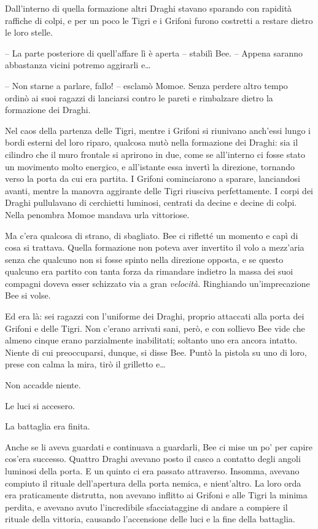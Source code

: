 {Dall'interno di quella formazione altri Draghi stavano sparando con
	rapidità raffiche di colpi, e per un poco le Tigri e i Grifoni furono
	costretti a restare dietro le loro stelle.}

{-- La parte posteriore di quell'affare lì è aperta -- stabilì Bee. --
	Appena saranno abbastanza vicini potremo aggirarli e\ldots{}}

{-- Non starne a parlare, fallo! -- esclamò Momoe. Senza perdere altro
	tempo ordinò ai suoi ragazzi di lanciarsi contro le pareti e rimbalzare
	dietro la formazione dei Draghi.}

{Nel caos della partenza delle Tigri, mentre i Grifoni si riunivano
	anch'essi lungo i bordi esterni del loro riparo, qualcosa mutò nella
	formazione dei Draghi: sia il cilindro che il muro frontale si aprirono
	in due, come se all'interno ci fosse stato un movimento molto energico,
	e all'istante essa invertì la direzione, tornando verso la porta da cui
	era partita. I Grifoni cominciarono a sparare, lanciandosi avanti,
	mentre la manovra aggirante delle Tigri riusciva perfettamente. I corpi
	dei Draghi pullulavano di cerchietti luminosi, centrati da decine e
	decine di colpi. Nella penombra Momoe mandava urla vittoriose.}

{Ma c'era qualcosa di strano, di sbagliato. Bee ci rifletté un momento e
	capì di cosa si trattava. Quella formazione non poteva aver invertito il
	volo a mezz'aria senza che qualcuno non si fosse spinto nella direzione
	opposta, e se questo qualcuno era partito con tanta forza da rimandare
	indietro la massa dei suoi compagni doveva esser schizzato via a gran
	\emph{velocità.} Ringhiando un'imprecazione Bee si volse.}

{Ed era là: sei ragazzi con l'uniforme dei Draghi, proprio attaccati
	alla porta dei Grifoni e delle Tigri. Non c'erano arrivati sani, però, e
	con sollievo Bee vide che almeno cinque erano parzialmente inabilitati;
	soltanto uno era ancora intatto. Niente di cui preoccuparsi, dunque, si
	disse Bee. Puntò la pistola su uno di loro, prese con calma la mira,
	tirò il grilletto e\ldots{}}

{Non accadde niente.}

{Le luci si accesero.}

{La battaglia era finita.}

{Anche se li aveva guardati e continuava a guardarli, Bee ci mise un po'
	per capire cos'era successo. Quattro Draghi avevano posto il casco a
	contatto degli angoli luminosi della porta. E un quinto ci era passato
	attraverso. Insomma, avevano compiuto il rituale dell'apertura della
	porta nemica, e nient'altro. La loro orda era praticamente distrutta,
	non avevano inflitto ai Grifoni e alle Tigri la minima perdita, e
	avevano avuto l'incredibile sfacciataggine di andare a compiere il
	rituale della vittoria, causando l'accensione delle luci e la fine della
	battaglia.}

